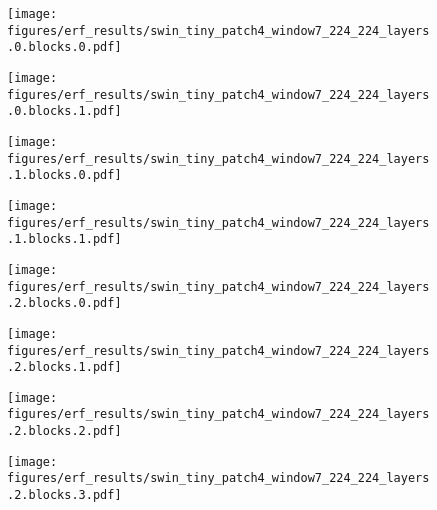 \documentclass{article}
\begin{document}
\begin{figure}[tb]
  \raggedright
  \begin{minipage}[t]{0.13\hsize}
    \centering
    \texttt{[image: figures/erf\_results/swin\_tiny\_patch4\_window7\_224\_224\_layers.0.blocks.0.pdf]}
    \label{figure:erf_swin:0}
  \end{minipage}
  \begin{minipage}[t]{0.13\hsize}
    \centering
    \texttt{[image: figures/erf\_results/swin\_tiny\_patch4\_window7\_224\_224\_layers.0.blocks.1.pdf]}
    \label{figure:erf_swin:1}
  \end{minipage}
  \begin{minipage}[t]{0.13\hsize}
    \centering
    \texttt{[image: figures/erf\_results/swin\_tiny\_patch4\_window7\_224\_224\_layers.1.blocks.0.pdf]}
    \label{figure:erf_swin:2}
  \end{minipage}
  \begin{minipage}[t]{0.13\hsize}
    \centering
    \texttt{[image: figures/erf\_results/swin\_tiny\_patch4\_window7\_224\_224\_layers.1.blocks.1.pdf]}
    \label{figure:erf_swin:3}
  \end{minipage}
  \begin{minipage}[t]{0.13\hsize}
    \centering
    \texttt{[image: figures/erf\_results/swin\_tiny\_patch4\_window7\_224\_224\_layers.2.blocks.0.pdf]}
    \label{figure:erf_swin:4}
  \end{minipage}
  \begin{minipage}[t]{0.13\hsize}
    \centering
    \texttt{[image: figures/erf\_results/swin\_tiny\_patch4\_window7\_224\_224\_layers.2.blocks.1.pdf]}
    \label{figure:erf_swin:5}
  \end{minipage}
  \begin{minipage}[t]{0.13\hsize}
    \centering
    \texttt{[image: figures/erf\_results/swin\_tiny\_patch4\_window7\_224\_224\_layers.2.blocks.2.pdf]}
    \label{figure:erf_swin:6}
  \end{minipage}
  \begin{minipage}[t]{0.13\hsize}
    \centering
    \texttt{[image: figures/erf\_results/swin\_tiny\_patch4\_window7\_224\_224\_layers.2.blocks.3.pdf]}
    \label{figure:erf_swin:7}
  \end{minipage}

\end{figure}
\end{document}
